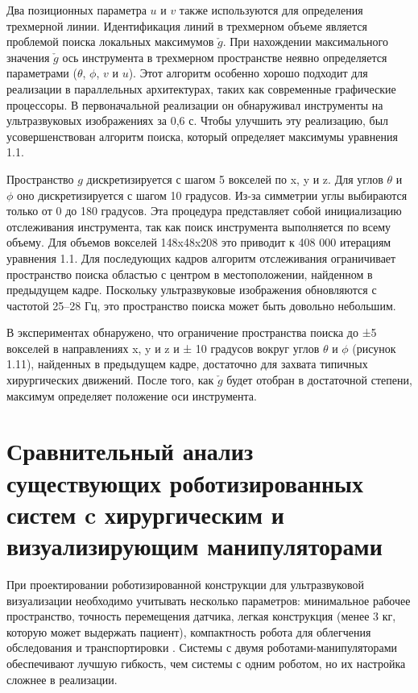 Два позиционных параметра $u$ и $v$ также используются для определения трехмерной линии. Идентификация линий в трехмерном объеме является проблемой поиска локальных максимумов $\check{g}$. При нахождении максимального значения $\check{g}$ ось инструмента в трехмерном пространстве неявно определяется параметрами ($\theta$, $\phi$, $v$ и $u$). Этот алгоритм особенно хорошо подходит для реализации в параллельных архитектурах, таких как современные графические процессоры. В первоначальной реализации он обнаруживал инструменты на ультразвуковых изображениях за 0,6 с. Чтобы улучшить эту реализацию, был усовершенствован алгоритм поиска, который определяет максимумы уравнения 1.1.

Пространство $g$ дискретизируется с шагом 5 вокселей по x, y и z. Для углов $\theta$ и $\phi$ оно дискретизируется с шагом 10 градусов. Из-за симметрии углы выбираются только от 0 до 180 градусов. Эта процедура представляет собой инициализацию отслеживания инструмента, так как поиск инструмента выполняется по всему объему. Для объемов вокселей 148x48x208 это приводит к 408 000 итерациям уравнения 1.1. Для последующих кадров алгоритм отслеживания ограничивает пространство поиска областью с центром в местоположении, найденном в предыдущем кадре. Поскольку ультразвуковые изображения обновляются с частотой 25–28 Гц, это пространство поиска может быть довольно небольшим.

В экспериментах обнаружено, что ограничение пространства поиска до ±5 вокселей в направлениях x, y и z и ± 10 градусов вокруг углов $\theta$ и $\phi$ (рисунок 1.11), найденных в предыдущем кадре, достаточно для захвата типичных хирургических движений. После того, как $\check{g}$ будет отобран в достаточной степени, максимум определяет положение оси инструмента.

\section{Сравнительный анализ существующих роботизированных систем c хирургическим и визуализирующим манипуляторами}

При проектировании роботизированной конструкции для ультразвуковой визуализации необходимо учитывать несколько параметров: минимальное рабочее пространство, точность перемещения датчика, легкая конструкция (менее 3 кг, которую может выдержать пациент), компактность робота для облегчения обследования и транспортировки \cite{litlink39}. Системы с двумя роботами-манипуляторами обеспечивают лучшую гибкость, чем системы с одним роботом, но их настройка сложнее в реализации.

